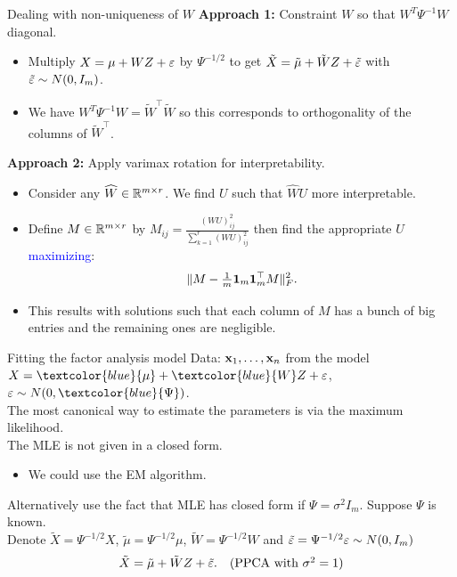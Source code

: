 \documentclass[11pt,handout,aspectratio=169]{beamer}
\begin{document}
\begin{frame}{Dealing with non-uniqueness of $W$}
\textbf{Approach 1: } Constraint $W$ so that $W^T\Psi^{-1}W$ diagonal.
    \begin{itemize}
        \item Multiply $X=\mu+WZ+\varepsilon$ by $\Psi^{-1/2}$ to get $\tilde X=\tilde \mu+\tilde WZ+\tilde {\varepsilon}$ with $\tilde{\varepsilon}\sim N(0,I_m)$.
        \item We have $W^T\Psi^{-1}W=\tilde W^\top \tilde W$ so this corresponds to orthogonality of the columns of $\tilde W^\top$.
    \end{itemize}
    \bigskip
    
    \textbf{Approach 2: } Apply \alert{varimax rotation} for interpretability.
    \begin{itemize}
    	\item Consider any $\widehat W\in \mathbb R^{m\times r}$. We find $U$ such that $\widehat WU$ more interpretable. 
    	\item Define $M\in \mathbb R^{m\times r}$ by $M_{ij}=\frac{(WU)_{ij}^2}{\sum_{k=1}^r (WU)_{ij}^2}$ then find the appropriate $U$ \textcolor{blue}{maximizing}: 
    	$$\|M-\tfrac1m \boldsymbol 1_m\boldsymbol 1_m^\top M\|^2_F.$$
    	\item This results with solutions such that each column of $M$ has a bunch of big entries and the remaining ones are negligible.
    \end{itemize}
\end{frame}

\begin{frame}{Fitting the factor analysis model}
Data: $\mathbf{x}_1,\ldots,\mathbf{x}_n$ from the model $X=\textcolor{blue}{\mu}+\textcolor{blue}{W}Z+\eps$, $\eps\sim N(0,\textcolor{blue}{\Psi})$.\\[3mm]
	The most canonical way to estimate the parameters is via the maximum likelihood. \\[3mm]
	The MLE is not given in a closed form. 
	\begin{itemize}
		\item We could use the EM algorithm.
	\end{itemize}
	\begin{block}{Alternatively use the fact that MLE has closed form if $\Psi=\sigma^2 I_m$.}
	Suppose $\Psi$ is known.\\[3mm] Denote $\tilde X=\Psi^{-1/2}X$, $\tilde \mu=\Psi^{-1/2}\mu$, $\tilde W=\Psi^{-1/2}W$ and $\tilde{\varepsilon} =\Psi^{-1/2}\varepsilon\sim N(0,I_m)$
	$$\tilde X=\tilde \mu+\tilde W Z+\tilde {\varepsilon}. \quad(\mbox{PPCA with $\sigma^2=1$})$$
	\end{block}
\end{frame}
\end{document}
